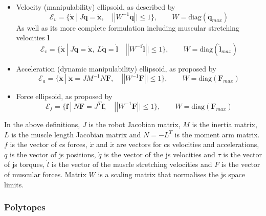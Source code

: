 \begin{itemize}
\itemindent=-13pt
\item Velocity (manipulability) ellipsoid, as described by \citet{yoshikawa1985manipulability}
\begin{equation}\label{eq:ev_dq_h}
\mathcal{E}_v = \{\dot{\bm{x}}~ |~ J\dot{\bm{q}} = \dot{\bm{x}}, \quad ||W^{-1}\dot{\bm{q}}|| \leq 1\}, \qquad W = \text{diag}(\dot{\bm{q}}_{max})
\end{equation}
\hspace{-13pt}
As well as its more complete formulation including muscular stretching velocities $\dot{\bm{l}}$
\begin{equation}\label{eq:ev_h}
\mathcal{E}_v = \{\dot{\bm{x}}~ |~ J\dot{\bm{q}} = \dot{\bm{x}},~ L\dot{\bm{q}} = \dot{\bm{l}} \quad ||W^{-1}\dot{\bm{l}}|| \leq 1\}, \qquad W = \text{diag}(\dot{\bm{l}}_{max})
\end{equation}

\item Acceleration (dynamic manipulability) ellipsoid, as proposed by \citet{khatib2009robotics}
\begin{equation}\label{eq:ea_h}
\mathcal{E}_{a} = \{\ddot{\bm{x}}~ |~ \ddot{\bm{x}} = JM^{-1}N\bm{F}, \quad ||W^{-1}\bm{F}|| \leq 1\}, \qquad W = \text{diag}(\bm{F}_{max})
\end{equation}

\item Force ellipsoid, as proposed by \citet{petric2019assistive}
\begin{equation}\label{eq:ef_h}
\mathcal{E}_{f} = \{\bm{f}~ |~ N\bm{F}  = J^T\bm{f},\quad ||W^{-1}\bm{F}|| \leq 1\}, \qquad W = \text{diag}(\bm{F}_{max})
\end{equation}
\end{itemize}

In the above definitions, $J$ is the robot Jacobian matrix, $M$ is the inertia matrix, $L$ is the muscle length Jacobian matrix and $N= -L^T$ is the moment arm matrix. $f$ is the vector of \gls{cs} forces, $\dot{x}$ and $\ddot{x}$ are vectors for \gls{cs} velocities and accelerations, $q$ is the vector of \gls{js} positions, $\dot{q}$ is the vector of the \gls{js} velocities and $\tau$ is the vector of \gls{js} torques, $\dot{l}$ is the vector of the muscle stretching velocities and $F$ is the vector of muscular forces.  Matrix $W$ is a scaling matrix that normalises the \gls{js} space limits.


\subsubsection*{Polytopes}

